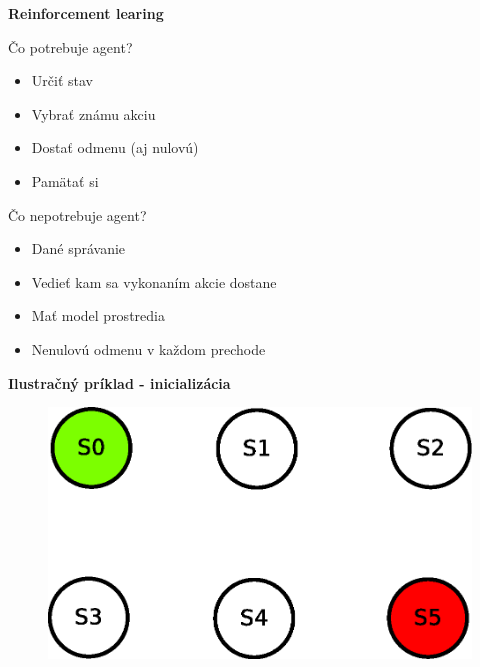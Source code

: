 \documentclass[xcolor=dvipsnames]{beamer}
\begin{document}
\begin{frame}{\bf Reinforcement learing}

\begin{minipage}{.5\textwidth}
Čo potrebuje agent?
\begin{itemize}
  \item Určiť stav
  \item Vybrať známu akciu
  \item Dostať odmenu (aj nulovú)
  \item Pamätať si
\end{itemize}

  \end{minipage}%
\begin{minipage}{.5\textwidth}
  Čo nepotrebuje agent?

  \begin{itemize}
    \item Dané správanie
    \item Vedieť kam sa vykonaním akcie dostane
    \item Mať model prostredia
    \item Nenulovú odmenu v každom prechode
  \end{itemize}

\end{minipage}


\end{frame}



\begin{frame}{\bf Ilustračný príklad - inicializácia}

\begin{figure}[!htb]
\includegraphics[scale=.5]{../diagrams/q_learning_table_01.eps}
\end{figure}

\end{frame}
\end{document}
